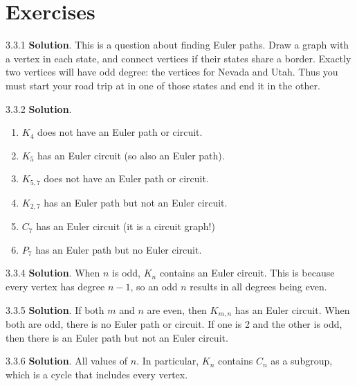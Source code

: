 \documentclass[11pt,]{book}
\theoremstyle{ptxplainnotitle}
\theoremstyle{ptxplaintitle}
\theoremstyle{ptxdefinitionnotitle}
\theoremstyle{ptxdefinitiontitle}
\theoremstyle{ptxdefinitionnotitle}
\theoremstyle{ptxdefinitiontitle}
\theoremstyle{ptxdefinitionnotitle}
\theoremstyle{ptxdefinitiontitle}
\theoremstyle{ptxdefinitiontitlenonumber}
\theoremstyle{ptxdefinitiontitlenonumber}
\numberwithin{equation}{chapter}
\begin{document}
\section*{Exercises}
\begin{divisionexercise}{3.3.1}
\textbf{Solution}.\quad%
\hypertarget{p-2899}{}%
This is a question about finding Euler paths. Draw a graph with a vertex in each state, and connect vertices if their states share a border. Exactly two vertices will have odd degree: the vertices for Nevada and Utah. Thus you must start your road trip at in one of those states and end it in the other.%
\end{divisionexercise}%
\begin{divisionexercise}{3.3.2}
\textbf{Solution}.\quad%
\hypertarget{p-2901}{}%
\leavevmode%
\begin{enumerate}[label=(\alph*)]
\item\hypertarget{li-1390}{}\(K_4\) does not have an Euler path or circuit.%
\item\hypertarget{li-1391}{}\(K_5\) has an Euler circuit (so also an Euler path).%
\item\hypertarget{li-1392}{}\(K_{5,7}\) does not have an Euler path or circuit.%
\item\hypertarget{li-1393}{}\(K_{2,7}\) has an Euler path but not an Euler circuit.%
\item\hypertarget{li-1394}{}\(C_7\) has an Euler circuit (it is a circuit graph!)%
\item\hypertarget{li-1395}{}\(P_7\) has an Euler path but no Euler circuit.%
\end{enumerate}
%
\end{divisionexercise}%
\begin{divisionexercise}{3.3.4}
\textbf{Solution}.\quad%
\hypertarget{p-2908}{}%
When \(n\) is odd, \(K_n\) contains an Euler circuit. This is because every vertex has degree \(n-1\), so an odd \(n\) results in all degrees being even.%
\end{divisionexercise}%
\begin{divisionexercise}{3.3.5}
\textbf{Solution}.\quad%
\hypertarget{p-2910}{}%
If both \(m\) and \(n\) are even, then \(K_{m,n}\) has an Euler circuit. When both are odd, there is no Euler path or circuit. If one is 2 and the other is odd, then there is an Euler path but not an Euler circuit.%
\end{divisionexercise}%
\begin{divisionexercise}{3.3.6}
\textbf{Solution}.\quad%
\hypertarget{p-2912}{}%
All values of \(n\). In particular, \(K_n\) contains \(C_n\) as a subgroup, which is a cycle that includes every vertex.%
\end{divisionexercise}%
\end{document}
